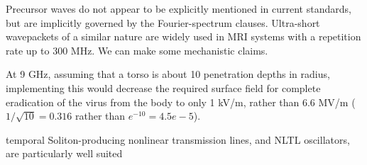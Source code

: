 \documentclass[paper.tex]{subfiles}
\begin{document}
Precursor waves do not appear to be explicitly mentioned in current standards, but are implicitly governed by the Fourier-spectrum clauses. Ultra-short wavepackets of a similar nature are widely used in MRI systems with a repetition rate up to 300 MHz. We can make some mechanistic claims.

At 9 GHz, assuming that a torso is about 10 penetration depths in radius, implementing this would decrease the required surface field for complete eradication of the virus from the body to only 1 kV/m, rather than 6.6 MV/m ($1/\sqrt{10}=0.316$ rather than $e^{-10}=4.5e-5$). 



temporal Soliton-producing nonlinear transmission lines, and NLTL oscillators, are particularly well suited 
\end{document}
